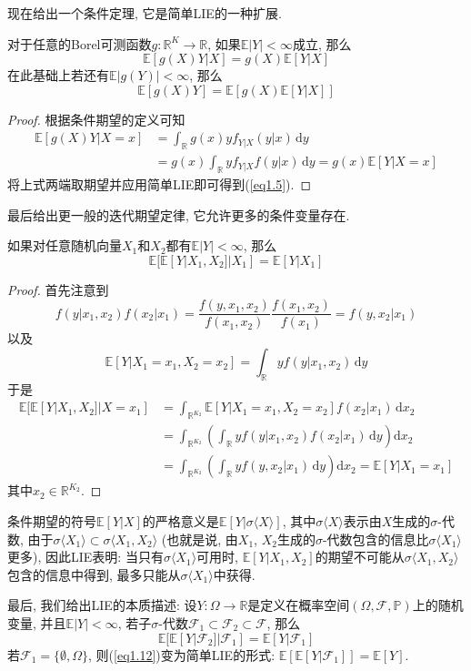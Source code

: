 \documentclass[cn, 12pt, math=mtpro2, bibstyle=apa, blue, twocol]{elegantbook}
\newcommand{\F}{\mathscr{F}}
\newcommand{\R}{\mathbb{R}}
\newcommand{\E}{\mathbb{E}}
\newcommand{\PP}{\mathbb{P}}
\begin{document}
现在给出一个条件定理, 它是简单LIE的一种扩展.
\begin{theorem}[条件定理]
  对于任意的Borel可测函数$g:\R^K\to\R$, 如果$\E|Y|<\infty$成立, 那么
  $$\E[g(X)Y|X]=g(X)\E[Y|X]$$
  在此基础上若还有$\E|g(Y)|<\infty$, 那么
  \begin{equation}\label{eq1.5}
    \E[g(X)Y]=\E[g(X)\E[Y|X]]
  \end{equation}
\end{theorem}
\begin{proof}
  根据条件期望的定义可知
  \begin{align*}
  \E[g(X)Y|X=x]&=\int_\R g(x)yf_{Y|X}(y|x)\,\text{d}y \\
  &=g(x)\int_{\R}yf_{Y|X}f(y|x)\,\text{d}y=g(x)\E[Y|X=x]
  \end{align*}
  将上式两端取期望并应用简单LIE即可得到(\ref{eq1.5}).
\end{proof}

最后给出更一般的迭代期望定律, 它允许更多的条件变量存在.
\begin{theorem}[迭代期望定律]
  如果对任意随机向量$X_1$和$X_2$都有$\E|Y|<\infty$, 那么
  $$\E[\E[Y|X_1,X_2]|X_1]=\E[Y|X_1]$$
\end{theorem}
\begin{proof}
  首先注意到
  $$f(y|x_1,x_2)f(x_2|x_1)=\frac{f(y,x_1,x_2)}{f(x_1,x_2)}\frac{f(x_1,x_2)}{f(x_1)}=f(y,x_2|x_1)$$
  以及
  $$\E[Y|X_1=x_1,X_2=x_2]=\int_\R yf(y|x_1,x_2)\,\text{d}y$$
  于是
  \begin{align*}
  \E[\E[Y|X_1,X_2]|X=x_1]&=\int_{\R^{K_2}}\E[Y|X_1=x_1,X_2=x_2]f(x_2|x_1)\,\text{d}x_2 \\
  &=\int_{\R^{K_2}}\left(\int_\R yf(y|x_1,x_2)f(x_2|x_1)\,\text{d}y\right)\text{d}x_2 \\
  &=\int_{\R^{K_2}}\left(\int_\R yf(y,x_2|x_1)\,\text{d}y\right)\text{d}x_2=\E[Y|X_1=x_1]
  \end{align*}
  其中$x_2\in\R^{K_2}$.
\end{proof}

条件期望的符号$\E[Y|X]$的严格意义是$\E[Y|\sigma\langle X\rangle]$, 其中$\sigma\langle X\rangle$表示由$X$生成的$\sigma$-代数, 由于$\sigma\langle X_1\rangle\subset\sigma\langle X_1,X_2\rangle$ (也就是说, 由$X_1$, $X_2$生成的$\sigma$-代数包含的信息比$\sigma\langle X_1\rangle$更多), 因此LIE表明: 当只有$\sigma\langle X_1\rangle$可用时, $\E[Y|X_1,X_2]$的期望不可能从$\sigma\langle X_1,X_2\rangle$包含的信息中得到, 最多只能从$\sigma\langle X_1\rangle$中获得.

最后, 我们给出LIE的本质描述: 设$Y:\Omega\to\R$是定义在概率空间$(\Omega,\F,\PP)$上的随机变量, 并且$\E|Y|<\infty$, 若子$\sigma$-代数$\F_1\subset\F_2\subset\mathscr{F}$, 那么
\begin{equation}\label{eq1.12}
  \E[\E[Y|\F_2]|\F_1]=\E[Y|\mathscr{F}_1]
\end{equation}
若$\mathscr{F}_1=\{\emptyset,\Omega\}$, 则(\ref{eq1.12})变为简单LIE的形式: $\E[\E[Y|\mathscr{F}_1]]=\E[Y]$.
\end{document}
